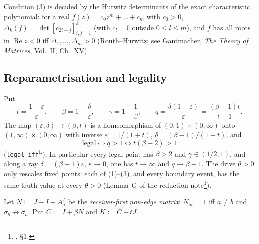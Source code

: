 \documentclass[11pt]{article}
\theoremstyle{definition}
\newcommand{\eps}{\varepsilon}
\newcommand{\Rea}{\operatorname{Re}}
\newcommand{\lean}{\textsuperscript{\textsf{L}}}
\begin{document}
Condition (3) is decided by the Hurwitz determinants of the exact characteristic polynomial: for a real
$f(z)=c_0z^m+\dots+c_m$ with $c_0>0$, $\Delta_k(f)=\det[c_{2i-j}]_{i,j=1}^{k}$ (with $c_l=0$ outside
$0\le l\le m$), and $f$ has all roots in $\Rea z<0$ iff $\Delta_1,\dots,\Delta_m>0$ (Routh--Hurwitz;
see Gantmacher, \emph{The Theory of Matrices}, Vol.~II, Ch.~XV).

\subsection{Reparametrisation and legality}
Put
\[
t=\frac{1-\eps}{\eps},\qquad \beta=1+\frac{\delta}{\eps},\qquad \gamma=1-\frac1\beta,\qquad
q=\frac{\delta(1-\eps)}{\eps}=\frac{(\beta-1)t}{t+1}.
\]
The map $(\eps,\delta)\mapsto(\beta,t)$ is a homeomorphism of $(0,1)\times(0,\infty)$ onto
$(1,\infty)\times(0,\infty)$ with inverse $\eps=1/(1+t)$, $\delta=(\beta-1)/(1+t)$, and
\begin{equation}\label{eq:legal}
\text{legal}\iff q>1\iff t(\beta-2)>1
\end{equation}
(\texttt{legal\_iff}\lean). In particular every legal point has $\beta>2$ and $\gamma\in(1/2,1)$, and
along a ray $\delta=(\beta-1)\eps$, $\eps\to0$, one has $t\to\infty$ and $q\to\beta-1$. The drive
$\theta>0$ only rescales fixed points: each of (1)--(3), and every boundary event, has the same truth
value at every $\theta>0$ (Lemma~G of the reduction note\footnote{, \S1.}).

Let $N:=J-I-A_\sigma^T$ be the \emph{receiver-first non-edge matrix}: $N_{ab}=1$ iff $a\ne b$ and
$\sigma_b\not\to\sigma_a$. Put $C:=I+\beta N$ and $K:=C+tJ$.
\end{document}
